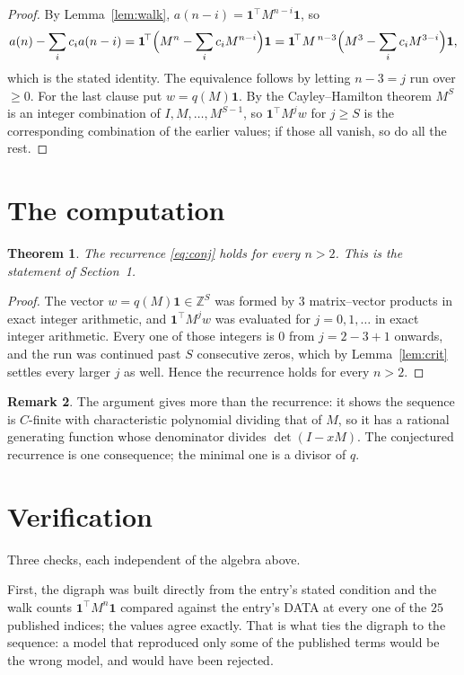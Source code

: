 \documentclass[11pt,a4paper]{article}
\theoremstyle{plain}
\newtheorem{theorem}{Theorem}
\theoremstyle{definition}
\newtheorem{remark}[theorem]{Remark}
\begin{document}
\begin{proof}
By Lemma~\ref{lem:walk}, $a(n-i)=\mathbf{1}^{\!\top}M^{n-i}\mathbf{1}$, so
\[
a(n)-\sum_i c_i a(n-i)
=\mathbf{1}^{\!\top}\Bigl(M^{n}-\sum_i c_i M^{n-i}\Bigr)\mathbf{1}
=\mathbf{1}^{\!\top}M^{\,n-3}\Bigl(M^{3}-\sum_i c_i M^{3-i}\Bigr)\mathbf{1},
\]
which is the stated identity. The equivalence follows by letting $n-3=j$ run over
$\ge0$. For the last clause put $w=q(M)\mathbf{1}$. By the Cayley--Hamilton theorem
$M^{S}$ is an integer combination of $I,M,\dots,M^{S-1}$, so
$\mathbf{1}^{\!\top}M^{j}w$ for $j\ge S$ is the corresponding combination of the
earlier values; if those all vanish, so do all the rest.
\end{proof}

\section{The computation}

\begin{theorem}
The recurrence \eqref{eq:conj} holds for every $n>2$. This is the statement of
Section~1.
\end{theorem}

\begin{proof}
The vector $w=q(M)\mathbf{1}\in\mathbb{Z}^{S}$ was formed by $3$ matrix--vector
products in exact integer arithmetic, and $\mathbf{1}^{\!\top}M^{j}w$ was evaluated for
$j=0,1,\dots$ in exact integer arithmetic. Every one of those integers is $0$ from
$j=2-3+1$ onwards, and the run was continued past $S$ consecutive zeros, which by
Lemma~\ref{lem:crit} settles every larger $j$ as well. Hence the recurrence holds for
every $n>2$.
\end{proof}

\begin{remark}
The argument gives more than the recurrence: it shows the sequence is $C$-finite with
characteristic polynomial dividing that of $M$, so it has a rational generating function
whose denominator divides $\det(I-xM)$. The conjectured recurrence is one consequence; the
minimal one is a divisor of $q$.
\end{remark}

\section{Verification}

Three checks, each independent of the algebra above.

First, the digraph was built directly from the entry's stated condition and the walk counts
$\mathbf{1}^{\!\top}M^{n}\mathbf{1}$ compared against the entry's DATA at every one of
the $25$ published indices; the values agree exactly. That is what ties the digraph to
the sequence: a model that reproduced only some of the published terms would be the wrong
model, and would have been rejected.
\end{document}
